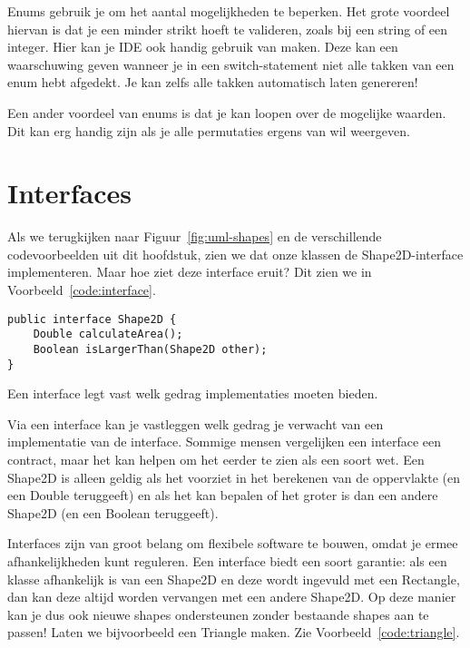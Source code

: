 \documentclass[dutch,a4paper,12pt,doubleside]{book}
\begin{document}
Enums gebruik je om het aantal mogelijkheden te beperken. Het grote voordeel hiervan is dat je 
een minder strikt hoeft te valideren, zoals bij een string of een integer. Hier kan je IDE ook 
handig gebruik van maken. Deze kan een waarschuwing geven wanneer je in een switch-statement niet 
alle takken van een enum hebt afgedekt. Je kan zelfs alle takken automatisch laten genereren!

Een ander voordeel van enums is dat je kan loopen over de mogelijke waarden. Dit kan erg handig zijn 
als je alle permutaties ergens van wil weergeven.

\section{Interfaces}
Als we terugkijken naar Figuur~\ref{fig:uml-shapes} en de verschillende codevoorbeelden uit dit hoofdstuk,
zien we dat onze klassen de Shape2D-interface implementeren. Maar hoe ziet deze interface eruit?
Dit zien we in Voorbeeld~\ref{code:interface}.

\begin{listing}[H]
\begin{verbatim}
public interface Shape2D {
    Double calculateArea();
    Boolean isLargerThan(Shape2D other);
}
\end{verbatim}
\caption{Een interface legt vast welk gedrag implementaties moeten bieden.}
\label{code:interface}
\end{listing}

Via een interface kan je vastleggen welk gedrag je verwacht van een implementatie van
de interface. Sommige mensen vergelijken een interface een contract, maar het kan helpen 
om het eerder te zien als een soort wet. Een Shape2D is alleen geldig als het voorziet in 
het berekenen van de oppervlakte (en een Double teruggeeft) en als het kan bepalen of het 
groter is dan een andere Shape2D (en een Boolean teruggeeft).

Interfaces zijn van groot belang om flexibele software te bouwen, omdat je ermee afhankelijkheden 
kunt reguleren. Een interface biedt een soort garantie: als een klasse afhankelijk is van een 
Shape2D en deze wordt ingevuld met een Rectangle, dan kan deze altijd worden vervangen met een 
andere Shape2D. Op deze manier kan je dus ook nieuwe shapes ondersteunen zonder bestaande 
shapes aan te passen! Laten we bijvoorbeeld een Triangle maken. Zie Voorbeeld~\ref{code:triangle}.
\end{document}
